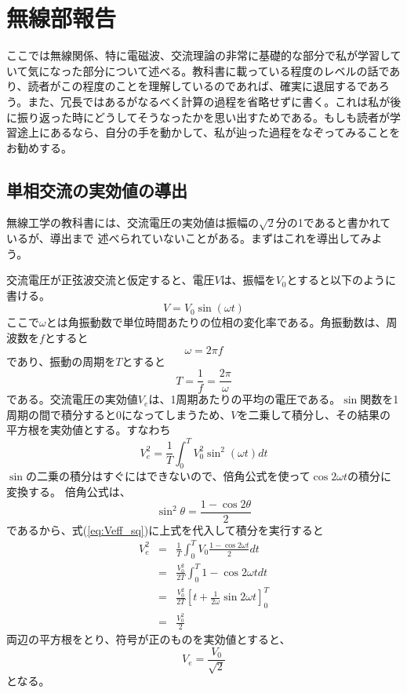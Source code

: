 \chapter{無線部報告}
ここでは無線関係、特に電磁波、交流理論の非常に基礎的な部分で私が学習していて気になった部分について述べる。教科書に載っている程度のレベルの話であり、読者がこの程度のことを理解しているのであれば、確実に退屈するであろう。また、冗長ではあるがなるべく計算の過程を省略せずに書く。これは私が後に振り返った時にどうしてそうなったかを思い出すためである。もしも読者が学習途上にあるなら、自分の手を動かして、私が辿った過程をなぞってみることをお勧めする。

\section{単相交流の実効値の導出}
無線工学の教科書には、交流電圧の実効値は振幅の$\sqrt{2}$分の1であると書かれているが、導出まで
述べられていないことがある。まずはこれを導出してみよう。

交流電圧が正弦波交流と仮定すると、電圧$V$は、振幅を$V_0$とすると以下のように書ける。
\begin{equation}
V=V_0 \sin(\omega t) \label{eq:defv}
\end{equation}
ここで$\omega$とは角振動数で単位時間あたりの位相の変化率である。角振動数は、周波数を$f$とすると
\[
\omega = 2 \pi f
\]
であり、振動の周期を$T$とすると
\[
T = \frac{1}{f} = \frac{2 \pi}{\omega}
\]
である。交流電圧の実効値$V_e$は、1周期あたりの平均の電圧である。$\sin$関数を1周期の間で積分すると$0$になってしまうため、$V$を二乗して積分し、その結果の平方根を実効値とする。すなわち
\begin{equation}
V_e^2 =\frac{1}{T} \int_{0}^{T}V_0^2\sin^2(\omega t)dt \label{eq:Veff_sq}
\end{equation}
$\sin$の二乗の積分はすぐにはできないので、倍角公式を使って$\cos 2\omega t$の積分に変換する。
倍角公式は、
\[
\sin^2\theta = \frac{1-\cos 2\theta}{2}
\]
であるから、式(\ref{eq:Veff_sq})に上式を代入して積分を実行すると
\begin{eqnarray*}
V_e^2 &=& \frac{1}{T}\int_{0}^{T} V_0 \frac{1-\cos 2\omega t}{2} dt \\
&=& \frac{V_0^2}{2T}\int_0^{T} 1 - \cos 2\omega t dt \\
&=& \frac{V_0^2}{2T}[t + \frac{1}{2 \omega}\sin 2\omega t ]_0^{T} \\
&=& \frac{V_0^2}{2}
\end{eqnarray*}
両辺の平方根をとり、符号が正のものを実効値とすると、
\[
V_e = \frac{V_0}{\sqrt{2}}
\]
となる。

